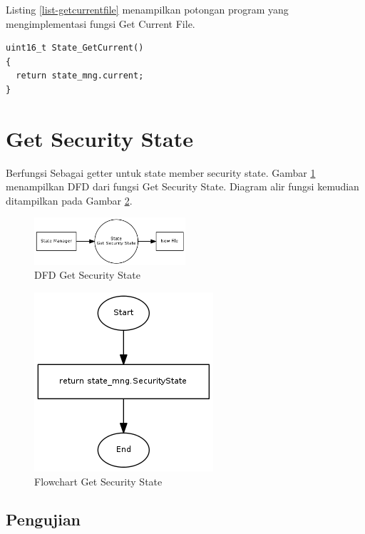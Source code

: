 Listing \ref{list-getcurrentfile} menampilkan potongan program yang mengimplementasi fungsi Get Current File.

\begin{lstlisting}[caption={Listing Program Fungsi Get Current File}, label={list-getcurrentfile}]
uint16_t State_GetCurrent()
{
  return state_mng.current;
}
\end{lstlisting}


\section{Get Security State}
\label{sec_getsecuritystate}

Berfungsi Sebagai getter untuk state member security state. Gambar \ref{fig-dfd-getsecuritystate} menampilkan DFD dari fungsi Get Security State. Diagram alir fungsi kemudian ditampilkan pada Gambar \ref{fig-flow-getsecuritystate}. 

\begin{figure}[h]
\centering
\includegraphics[width=0.5\textwidth]{image/state/dfd_getsecuritystate.png}
\caption{DFD Get Security State}
\label{fig-dfd-getsecuritystate}
\end{figure}

\begin{figure}[h]
\centering
\includegraphics[height=0.25\textheight]{image/state/flow_getsecuritystate.png}
\caption{Flowchart Get Security State}
\label{fig-flow-getsecuritystate}
\end{figure}

\subsection {Pengujian}

